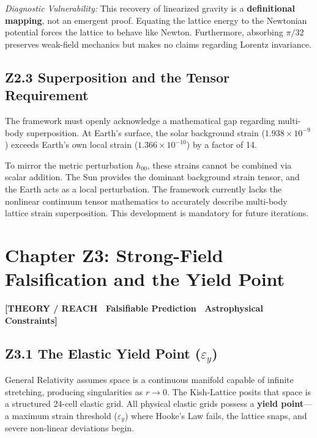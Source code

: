 \documentclass[11pt, letterpaper, openany]{book}
\begin{document}
\textit{Diagnostic Vulnerability:} This recovery of linearized gravity is a \textbf{definitional mapping}, not an emergent proof. Equating the lattice energy to the Newtonian potential forces the lattice to behave like Newton. Furthermore, absorbing $\pi/32$ preserves weak-field mechanics but makes no claims regarding Lorentz invariance.

\subsection*{Z2.3 Superposition and the Tensor Requirement}

The framework must openly acknowledge a mathematical gap regarding multi-body superposition. At Earth's surface, the solar background strain ($1.938 \times 10^{-9}$) exceeds Earth's own local strain ($1.366 \times 10^{-10}$) by a factor of 14. 

To mirror the metric perturbation $h_{00}$, these strains cannot be combined via scalar addition. The Sun provides the dominant background strain tensor, and the Earth acts as a local perturbation. The framework currently lacks the nonlinear continuum tensor mathematics to accurately describe multi-body lattice strain superposition. This development is mandatory for future iterations.


\vspace{1cm}
\section*{Chapter Z3: Strong-Field Falsification and the Yield Point}

\begin{center}
{\color{theorytag}\textbf{[THEORY / REACH \textbullet\ Falsifiable Prediction \textbullet\ Astrophysical Constraints]}}
\end{center}

\subsection*{Z3.1 The Elastic Yield Point ($\varepsilon_y$)}

General Relativity assumes space is a continuous manifold capable of infinite stretching, producing singularities as $r \to 0$. The Kish-Lattice posits that space is a structured 24-cell elastic grid. All physical elastic grids possess a \textbf{yield point}—a maximum strain threshold ($\varepsilon_y$) where Hooke's Law fails, the lattice snaps, and severe non-linear deviations begin.
\end{document}
